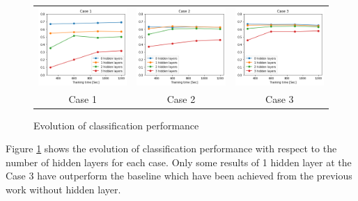 \documentclass[letterpaper, 10 pt, conference]{ieeeconf}  %
\begin{document}
\begin{figure}[tbh]
    \centering
    \begin{centering}
    \begin{tabular}{ccc}
        \includegraphics[width=0.30\linewidth, trim=0cm 0cm 0cm 0.65cm, clip=true]{10trials/evolAvgC1}&
        \includegraphics[width=0.30\linewidth, trim=0cm 0cm 0cm 0.65cm, clip=true]{10trials/evolAvgC2}&
        \includegraphics[width=0.30\linewidth, trim=0cm 0cm 0cm 0.65cm, clip=true]{10trials/evolAvgC3}\\
        Case 1 & Case 2 & Case 3
        \end{tabular}
     \end{centering}
     \caption{Evolution of classification performance}
     \label{fig:evHlayer}
    \vspace{-10pt}
\end{figure}

Figure \ref{fig:evHlayer} shows the evolution of classification performance with respect to the number of hidden layers for each case. Only some results of 1 hidden layer at the Case 3 have outperform the baseline which have been achieved from the previous work \cite{hopkins2018spiking} without hidden layer.

\end{document}
